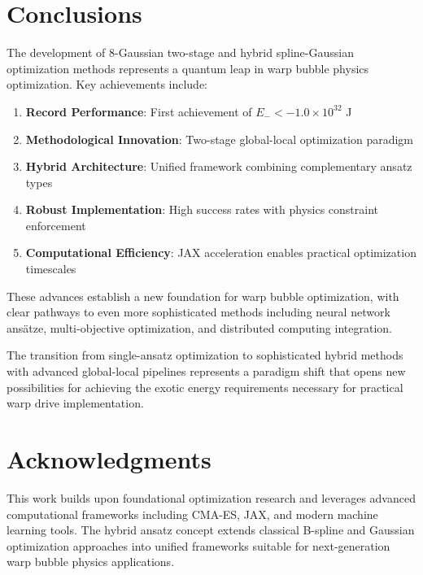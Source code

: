 \documentclass[11pt,a4paper]{article}
\begin{document}
\section{Conclusions}

The development of 8-Gaussian two-stage and hybrid spline-Gaussian optimization methods represents a quantum leap in warp bubble physics optimization. Key achievements include:

\begin{enumerate}
\item \textbf{Record Performance}: First achievement of $E_- < -1.0 \times 10^{32}$ J
\item \textbf{Methodological Innovation}: Two-stage global-local optimization paradigm
\item \textbf{Hybrid Architecture}: Unified framework combining complementary ansatz types
\item \textbf{Robust Implementation}: High success rates with physics constraint enforcement
\item \textbf{Computational Efficiency}: JAX acceleration enables practical optimization timescales
\end{enumerate}

These advances establish a new foundation for warp bubble optimization, with clear pathways to even more sophisticated methods including neural network ansätze, multi-objective optimization, and distributed computing integration.

The transition from single-ansatz optimization to sophisticated hybrid methods with advanced global-local pipelines represents a paradigm shift that opens new possibilities for achieving the exotic energy requirements necessary for practical warp drive implementation.

\section*{Acknowledgments}

This work builds upon foundational optimization research and leverages advanced computational frameworks including CMA-ES, JAX, and modern machine learning tools. The hybrid ansatz concept extends classical B-spline and Gaussian optimization approaches into unified frameworks suitable for next-generation warp bubble physics applications.
\end{document}
